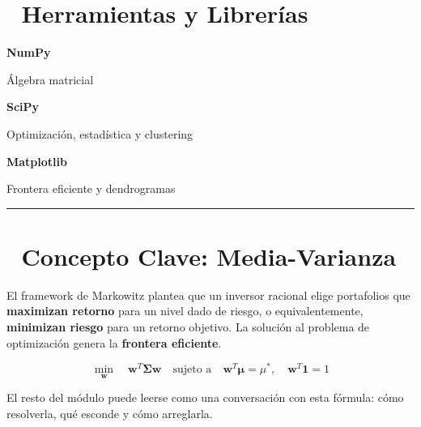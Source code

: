 \documentclass[
  spanish,
  letterpaper,
  DIV=11,
  numbers=noendperiod]{scrreprt}
\begin{document}
\section*{🧰 Herramientas y
Librerías}\label{herramientas-y-libreruxedas-1}


\textbf{NumPy}

Álgebra matricial

\textbf{SciPy}

Optimización, estadística y clustering

\textbf{Matplotlib}

Frontera eficiente y dendrogramas

\begin{center}\rule{0.5\linewidth}{0.5pt}\end{center}

\section*{🔑 Concepto Clave:
Media-Varianza}\label{concepto-clave-media-varianza}


\begin{tcolorbox}[enhanced jigsaw, bottomrule=.15mm, colback=white, breakable, left=2mm, colframe=quarto-callout-important-color-frame, leftrule=.75mm, arc=.35mm, toprule=.15mm, rightrule=.15mm, opacityback=0]
\begin{minipage}[t]{5.5mm}
\textcolor{quarto-callout-important-color}{\faExclamation}
\end{minipage}%
\begin{minipage}[t]{\textwidth - 5.5mm}

El framework de Markowitz plantea que un inversor racional elige
portafolios que \textbf{maximizan retorno} para un nivel dado de riesgo,
o equivalentemente, \textbf{minimizan riesgo} para un retorno objetivo.
La solución al problema de optimización genera la \textbf{frontera
eficiente}.

\[\min_{\mathbf{w}} \quad \mathbf{w}^T \boldsymbol{\Sigma} \mathbf{w} \quad \text{sujeto a} \quad \mathbf{w}^T \boldsymbol{\mu} = \mu^*, \quad \mathbf{w}^T \mathbf{1} = 1\]

El resto del módulo puede leerse como una conversación con esta fórmula:
cómo resolverla, qué esconde y cómo arreglarla.

\end{minipage}%
\end{tcolorbox}
\end{document}
